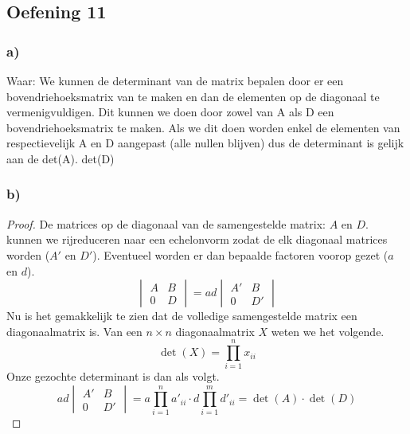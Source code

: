\documentclass[lineaire_algebra_oplossingen.tex]{subfiles}
\begin{document}
\subsection{Oefening 11}
\subsubsection*{a)}
Waar: We kunnen de determinant van de matrix bepalen door er een bovendriehoeksmatrix van te maken en dan de elementen op de diagonaal te vermenigvuldigen. Dit kunnen we doen door zowel van A als D een bovendriehoeksmatrix te maken. Als we dit doen worden enkel de elementen van respectievelijk A en D aangepast (alle nullen blijven) dus de determinant is gelijk aan de det(A). det(D)

\subsubsection*{b)}
\begin{proof}
De matrices op de diagonaal van de samengestelde matrix: $A$ en $D$. kunnen we rijreduceren naar een echelonvorm zodat de elk diagonaal matrices worden ($A'$ en $D'$). Eventueel worden er dan bepaalde factoren voorop gezet ($a$ en $d$).
\[
\begin{vmatrix}
A & B\\
0 & D
\end{vmatrix}
=
ad
\begin{vmatrix}
A' & B\\
0 & D'
\end{vmatrix}
\]
Nu is het gemakkelijk te zien dat de volledige samengestelde matrix een diagonaalmatrix is.
Van een $n\times n$ diagonaalmatrix $X$ weten we het volgende.
\[
\det \left({X}\right) = \prod_{i \mathop = 1}^n x_{ii}
\]
Onze gezochte determinant is dan als volgt.
\[
ad
\begin{vmatrix}
A' & B\\
0 & D'
\end{vmatrix} = a\prod_{i \mathop = 1}^n a'_{ii} \cdot d \prod_{i \mathop = 1}^m d'_{ii} = \det \left({A}\right)\cdot\det \left({D}\right)
\]
\end{proof}
\end{document}
